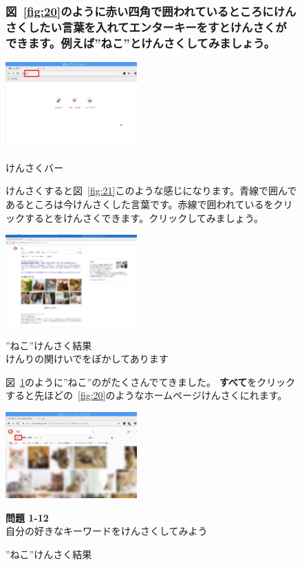 \begin{figure}
  \subsubsection{図~\ref{fig:20}のように赤い四角で囲われているところにけんさくしたい言葉を入れてエンターキーをすとけんさくができます。例えば”ねこ”とけんさくしてみましょう。}
  \centering
  \includegraphics[width=0.45\textwidth]{text01-img/textbook-img077.png}
  \caption{けんさくバー}\label{fig:20}
  
  \flushleft
  けんさくすると図~\ref{fig:21}このような感じになります。青線で囲んであるところは今けんさくした言葉です。赤線で囲われている\textbf{}をクリックするとをけんさくできます。クリックしてみましょう。


  \centering
  \includegraphics[width=0.45\textwidth]{text01-img/textbook-img078.png}
  \caption{”ねこ”けんさく結果\\
  けんりの関けいでをぼかしてあります}\label{fig:21}
  \flushleft
  図~\ref{fig:22}のように”ねこ”のがたくさんでてきました。
  \textbf{すべて}をクリックすると先ほどの~\ref{fig:20}のようなホームページけんさくにれます。


  \centering
  \includegraphics[width=0.45\textwidth]{text01-img/textbook-img079.png}
  \caption{”ねこ”けんさく結果}\label{fig:22}
  \flushleft
  \noindent \textbf{問題 1-12}\\
  自分の好きなキーワードをけんさくしてみよう

\end{figure}
\clearpage



